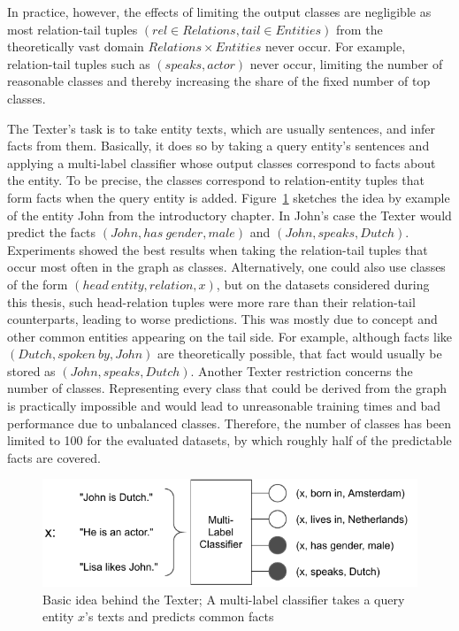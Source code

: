 In practice, however, the effects of limiting the output classes are negligible as most relation-tail tuples $(rel \in Relations, tail \in Entities)$ from the theoretically vast domain $Relations \times Entities$ never occur. For example, relation-tail tuples such as $(speaks, actor)$ never occur, limiting the number of reasonable classes and thereby increasing the share of the fixed number of top classes.

The Texter's task is to take entity texts, which are usually sentences, and infer facts from them. Basically, it does so by taking a query entity's sentences and applying a multi-label classifier whose output classes correspond to facts about the entity. To be precise, the classes correspond to relation-entity tuples that form facts when the query entity is added. Figure~\ref{fig:4_approach/1_texter/texter_idea} sketches the idea by example of the entity John from the introductory chapter. In John's case the Texter would predict the facts $(John, has~gender, male)$ and $(John, speaks, Dutch)$. Experiments showed the best results when taking the relation-tail tuples that occur most often in the graph as classes. Alternatively, one could also use classes of the form $(head~entity, relation, x)$, but on the datasets considered during this thesis, such head-relation tuples were more rare than their relation-tail counterparts, leading to worse predictions. This was mostly due to concept and other common entities appearing on the tail side. For example, although facts like $(Dutch, spoken~by, John)$ are theoretically possible, that fact would usually be stored as $(John, speaks, Dutch)$. Another Texter restriction concerns the number of classes. Representing every class that could be derived from the graph is practically impossible and would lead to unreasonable training times and bad performance due to unbalanced classes. Therefore, the number of classes has been limited to 100 for the evaluated datasets, by which roughly half of the predictable facts are covered.

\begin{figure}[t]
    \centering
    \includegraphics[width=\textwidth]{4_approach/1_texter/texter_idea}
    \caption{Basic idea behind the Texter; A multi-label classifier takes a query entity $x$'s texts and predicts common facts}
    \label{fig:4_approach/1_texter/texter_idea}
\end{figure}


